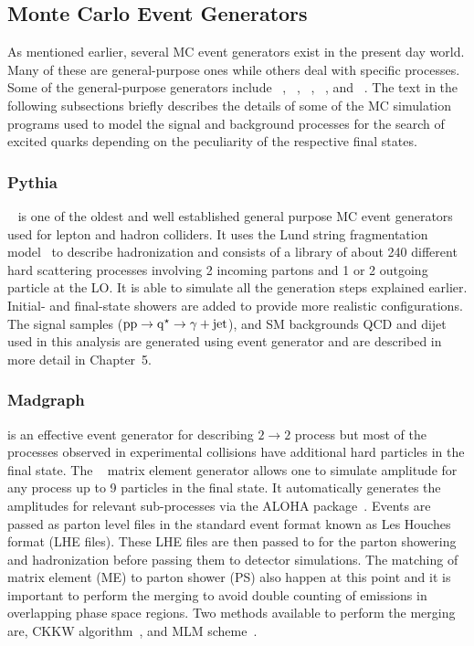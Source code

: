 \subsection{Monte Carlo Event Generators}
As mentioned earlier, several MC event generators exist in the present day world. Many of these are general-purpose ones while others deal with 
specific processes. Some of the general-purpose generators include \pythia~\cite{Sjostrand:2006za}, \madgraph~\cite{Alwall:2014hca}, 
\herwigpp~\cite{Bahr:2008pv}, \alpgen~\cite{Mangano:2002ea}, and \sherpa~\cite{Gleisberg:2008ta}. The text in the following subsections 
briefly describes the details of some of the MC simulation programs used to model the signal and background processes for the search of excited quarks 
depending on the peculiarity of the respective final states.

\subsubsection{Pythia}
\pythia~\cite{Sjostrand:2006za} is one of the oldest and well established general purpose MC event generators used for lepton and hadron colliders. 
It uses the Lund string fragmentation model~\cite{Sjostrand:1986hx} to describe hadronization and consists of a library of about 240 different
hard scattering processes involving 2 incoming partons and 1 or 2 outgoing particle at the LO. It is able to simulate all the generation steps
explained earlier. Initial- and final-state showers are added to provide more realistic configurations. The signal samples ($\mathrm{pp}\rightarrow\mathrm{q^\star}
\rightarrow\gamma+\mathrm{jet}$), and SM backgrounds QCD \gamjet and dijet used in this analysis are generated using \pythia event generator and are described
in more detail in Chapter~5.

\subsubsection{Madgraph}
\pythia is an effective event generator for describing $2\rightarrow{2}$ process but most of the processes observed in experimental
collisions have additional hard particles in the final state. The \madgraph~\cite{Alwall:2014hca} matrix element generator allows
one to simulate amplitude for any process up to 9 particles in the final state. It automatically generates the amplitudes for relevant
sub-processes via the ALOHA package~\cite{deAquino:2011ub}. Events are passed as parton level files in the standard
event format known as Les Houches format (LHE files)\cite{Alwall:2006yp}. These LHE files are then passed to \pythia for the parton showering
and hadronization before passing them to detector simulations. The matching of matrix element (ME) to parton shower (PS) also happen
at this point and it is important to perform the merging to avoid double counting of emissions in overlapping phase space regions. Two methods
available to perform the merging are, CKKW algorithm~\cite{Krauss:2002up}, and MLM scheme~\cite{Mangano:2001xp}. 

